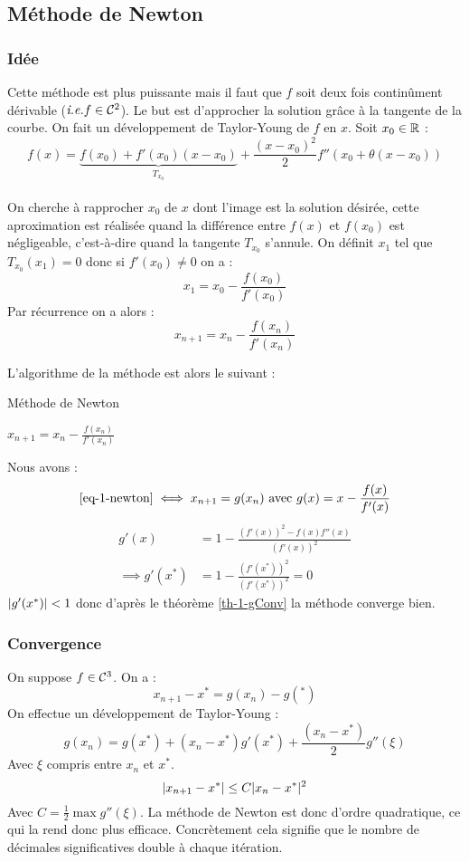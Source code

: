 	\subsection{Méthode de Newton}
	
		\subsubsection{Idée}
			Cette méthode est plus puissante mais il faut que $f$ soit deux fois continûment dérivable ($\textit{i.e.} f \in \mathcal{C}^2$).
			Le but est d'approcher la solution grâce à la tangente de la courbe.
			On fait un développement de Taylor-Young de $f$ en $x$.
			Soit $x_0 \in \mathbb{R}$ :
			$$
				f(x) = \underbrace{f(x_0) + f'(x_0)(x-x_0)}_{T_{x_0}} + \frac{(x-x_0)^2}{2}f''(x_0 +\theta(x-x_0))
			$$
			\\
			On cherche à rapprocher $x_0$ de $x$ dont l'image est la solution désirée, cette aproximation est réalisée quand la différence entre $f(x)$ et $f(x_0)$ est négligeable, c'est-à-dire quand la tangente $T_{x_0}$ s'annule.
			On définit $x_1$ tel que $T_{x_0}(x_1)=0$ donc si $f'(x_0) \neq 0 $ on a :
			$$
				x_1 = x_0 - \frac{f(x_0)}{f'(x_0)}
			$$
			Par récurrence on a alors :
			\begin{equation}
				\label{eq-1-newton}
				x_{n+1} = x_n - \frac{f(x_n)}{f'(x_n)}
			\end{equation}

			L'algorithme de la méthode est alors le suivant :

			\begin{algorithm}[H]
				\caption{Méthode de Newton}
				{
					$x_{n+1} = x_n - \frac{f(x_n)}{f'(x_n)}$\;
				}
			\end{algorithm}

			Nous avons :
			$$
				\eqref{eq-1-newton} \iff x_{n+1} = g(x_n) \text{ avec } g(x) = x- \frac{f(x)}{f'(x)}
			$$
			\begin{align*}
				g'(x) 				&= 1 - \frac{\left(f'(x)\right)^2 - f(x)f''(x)}{\left(f'(x)\right)^2}	\\
				\implies g'(x^*) 	&= 1 - \frac{\left(f'(x^*)\right)^2}{\left(f'(x^*)\right)^2} = 0
			\end{align*}
			$\lvert g'(x^*) \rvert <1$ donc d'après le théorème \eqref{th-1-gConv} la méthode converge bien.

		\subsubsection{Convergence}
			On suppose $f\in \mathcal{C}^3$. On a :
			$$
				x_{n+1} - x^* = g(x_n) - g(^*)
			$$
			On effectue un développement de Taylor-Young : 
			$$
				g(x_n) = g(x^*) +(x_n - x^*)g'(x^*) + \frac{(x_n - x^*)}{2} g''(\xi)
			$$
			Avec $\xi$ compris entre $x_n$ et $x^*$.
			$$
				\lvert x_{n+1} - x^* \rvert \leq C\lvert x_n - x^* \rvert^2
			$$
			Avec $C = \frac{1}{2} \max g''(\xi)$.
			La méthode de Newton est donc d'ordre quadratique, ce qui la rend donc plus efficace.
			Concrètement cela signifie que le nombre de décimales significatives double à chaque itération.


